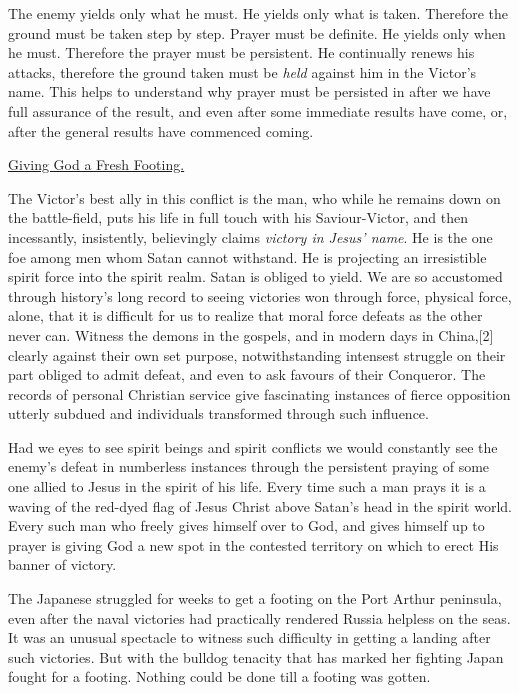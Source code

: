 The enemy yields only what he must. He yields only what is taken.
Therefore the ground must be taken step by step. Prayer must be definite.
He yields only when he must. Therefore the prayer must be persistent. He
continually renews his attacks, therefore the ground taken must be \textit{held}
against him in the Victor's name. This helps to understand why prayer
must be persisted in after we have full assurance of the result, and even
after some immediate results have come, or, after the general results have
commenced coming.



\underline{Giving God a Fresh Footing.}


The Victor's best ally in this conflict is the man, who while he remains
down on the battle-field, puts his life in full touch with his
Saviour-Victor, and then incessantly, insistently, believingly claims
\textit{victory in Jesus' name}. He is the one foe among men whom Satan cannot
withstand. He is projecting an irresistible spirit force into the spirit
realm. Satan is obliged to yield. We are so accustomed through history's
long record to seeing victories won through force, physical force, alone,
that it is difficult for us to realize that moral force defeats as the
other never can. Witness the demons in the gospels, and in modern days in
China,[2] clearly against their own set purpose, notwithstanding intensest
struggle on their part obliged to admit defeat, and even to ask favours of
their Conqueror. The records of personal Christian service give
fascinating instances of fierce opposition utterly subdued and individuals
transformed through such influence.

Had we eyes to see spirit beings and spirit conflicts we would constantly
see the enemy's defeat in numberless instances through the persistent
praying of some one allied to Jesus in the spirit of his life. Every time
such a man prays it is a waving of the red-dyed flag of Jesus Christ above
Satan's head in the spirit world. Every such man who freely gives himself
over to God, and gives himself up to prayer is giving God a new spot in
the contested territory on which to erect His banner of victory.

The Japanese struggled for weeks to get a footing on the Port Arthur
peninsula, even after the naval victories had practically rendered Russia
helpless on the seas. It was an unusual spectacle to witness such
difficulty in getting a landing after such victories. But with the bulldog
tenacity that has marked her fighting Japan fought for a footing. Nothing
could be done till a footing was gotten.

